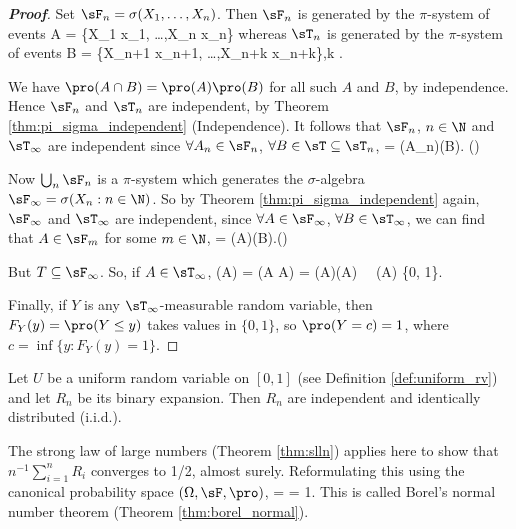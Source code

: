 \begin{proof}[\bf Proof]
Set $\sF_n = \sigma(X_1, \dots,X_n)$. Then $\sF_n$ is generated by the $\pi$-system of events
\be
A = \{X_1 \leq x_1, \dots ,X_n \leq x_n\}
\ee
whereas $\sT_n$ is generated by the $\pi$-system of events
\be
B = \{X_{n+1} \leq x_{n+1}, \dots ,X_{n+k} \leq x_{n+k}\},\quad k \in \N.
\ee

We have $\pro(A\cap B) = \pro(A)\pro(B)$ for all such $A$ and $B$, by independence. Hence $\sF_n$ and $\sT_n$ are independent, by Theorem \ref{thm:pi_sigma_independent} (Independence). It follows that $\sF_n$, $n\in\N$ and $\sT_\infty$ are independent since $\forall A_n \in \sF_n$, $\forall B\in \sT \subseteq \sT_n$,
\be
\pro{} = \pro(A_n)\pro(B). \quad\quad ()
\ee

Now $\bigcup_n \sF_n$ is a $\pi$-system which generates the $\sigma$-algebra $\sF_\infty = \sigma(X_n : n \in \N)$. So by Theorem \ref{thm:pi_sigma_independent} again, $\sF_\infty$ and $\sT_\infty$ are independent, since $\forall A \in \sF_\infty$, $\forall B\in \sT_\infty$, we can find that $A\in \sF_m$ for some $m\in \N$,
\be
\pro{} = \pro(A)\pro(B).\quad\quad ()
\ee

But $T \subseteq \sF_\infty$. So, if $A \in \sT_\infty$,
\be
\pro(A) = \pro(A \cap A) = \pro(A)\pro(A) \ \ra \ \pro(A) \in \{0, 1\}.
\ee

Finally, if $Y$ is any $\sT_\infty$-measurable random variable, then $F_Y (y) = \pro(Y \leq y)$ takes values in $\{0, 1\}$, so $\pro(Y = c) = 1$, where $c = \inf\{y : F_Y (y) = 1\}$.
\end{proof}


\begin{example}
Let $U$ be a uniform random variable on $[0, 1]$ (see Definition \ref{def:uniform_rv}) and let $R_n$ be its binary expansion. Then $R_n$ are independent and identically distributed (i.i.d.). 

The strong law of large numbers (Theorem \ref{thm:slln}) applies here to show that $n^{-1}\sum^n_{i=1} R_i$ converges to 1/2, almost surely. Reformulating this using the canonical probability space $(\Omega, \sF, \pro)$,
\be
\pro\bb{\left\{\omega \in (0, 1]: \frac{|\{k \leq n : \omega_k = 1\}|}n \to \frac 12\right\}} = \pro{} = 1.
\ee
This is called Borel's normal number theorem (Theorem \ref{thm:borel_normal}).
\end{example}


